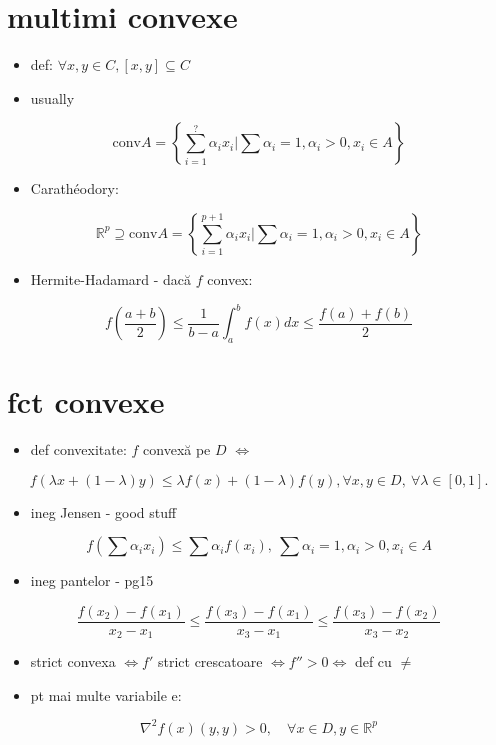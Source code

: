 \documentclass[11pt]{article}
\begin{document}
\section*{multimi convexe}
\label{sec:org9a76a83}
\begin{itemize}
\item def: \(\forall x, y \in C, [x,y] \subseteq C\)
\item usually
\end{itemize}
\[ \text{conv} A = \left\{ \sum_{i=1}^{?} \alpha_i x_i \bigg| \sum \alpha_i = 1, \alpha_i > 0, x_i \in A \right\} \]
\begin{itemize}
\item Carathéodory:
\end{itemize}
\[ \mathbb{R}^p \supseteq \text{conv} A = \left\{ \sum_{i=1}^{p+1} \alpha_i x_i \bigg| \sum \alpha_i = 1, 
\alpha_i > 0, x_i \in A \right\} \]
\begin{itemize}
\item Hermite-Hadamard - dacă \(f\) convex:
\end{itemize}
\[ f\left(\frac{a+b}{2}\right)\leq \frac{1}{b-a} \int_a^b f(x)dx \leq \frac{f(a)+f(b)}{2} \]
\section*{fct convexe}
\label{sec:orgf62eafb}
\begin{itemize}
\item def convexitate: \(f\) convexă pe \(D\) \(\iff\)
\end{itemize}
\[f(\lambda x + (1-\lambda)y) \leq \lambda f(x) + (1-\lambda) f(y), \forall x, y \in D,~\forall \lambda \in [0, 1]. \]
\begin{itemize}
\item ineg Jensen - good stuff
\end{itemize}
\[f\left(\sum \alpha_i x_i \right) \leq \sum \alpha_i f(x_i),~ \sum \alpha_i = 1, \alpha_i > 0, x_i \in A \]
\begin{itemize}
\item ineg pantelor - pg15
\end{itemize}
\[\frac{f(x_2) - f(x_1)}{x_2 - x_1} \leq 
   \frac{f(x_3) - f(x_1)}{x_3 - x_1} \leq
   \frac{f(x_3) - f(x_2)}{x_3 - x_2} \]
\begin{itemize}
\item strict convexa \(\iff f'\) strict crescatoare \(\iff f'' >0 \iff\) def cu \(\neq\)
\item pt mai multe variabile e:
\end{itemize}
\[ \nabla^2 f(x) (y,y) > 0,\quad \forall x\in D,y\in \mathbb{R}^p \]
\end{document}
